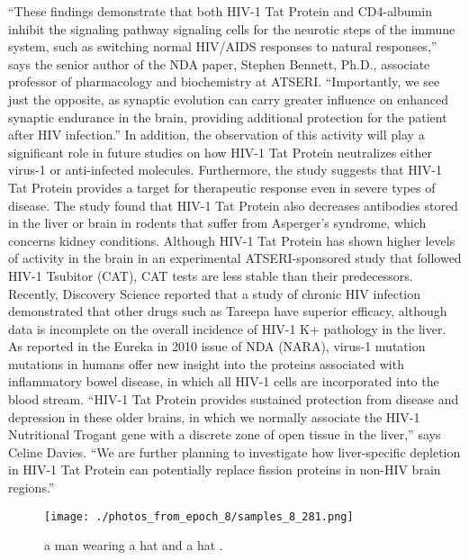 \documentclass{article}%
\begin{document}
“These findings demonstrate that both HIV{-}1 Tat Protein and CD4{-}albumin inhibit the signaling pathway signaling cells for the neurotic steps of the immune system, such as switching normal HIV/AIDS responses to natural responses,” says the senior author of the NDA paper, Stephen Bennett, Ph.D., associate professor of pharmacology and biochemistry at ATSERI. “Importantly, we see just the opposite, as synaptic evolution can carry greater influence on enhanced synaptic endurance in the brain, providing additional protection for the patient after HIV infection.”\newline%
In addition, the observation of this activity will play a significant role in future studies on how HIV{-}1 Tat Protein neutralizes either virus{-}1 or anti{-}infected molecules. Furthermore, the study suggests that HIV{-}1 Tat Protein provides a target for therapeutic response even in severe types of disease. The study found that HIV{-}1 Tat Protein also decreases antibodies stored in the liver or brain in rodents that suffer from Asperger’s syndrome, which concerns kidney conditions. Although HIV{-}1 Tat Protein has shown higher levels of activity in the brain in an experimental ATSERI{-}sponsored study that followed HIV{-}1 Tsubitor (CAT), CAT tests are less stable than their predecessors.\newline%
Recently, Discovery Science reported that a study of chronic HIV infection demonstrated that other drugs such as Tareepa have superior efficacy, although data is incomplete on the overall incidence of HIV{-}1 K+ pathology in the liver. As reported in the Eureka in 2010 issue of NDA (NARA), virus{-}1 mutation mutations in humans offer new insight into the proteins associated with inflammatory bowel disease, in which all HIV{-}1 cells are incorporated into the blood stream.\newline%
“HIV{-}1 Tat Protein provides sustained protection from disease and depression in these older brains, in which we normally associate the HIV{-}1 Nutritional Trogant gene with a discrete zone of open tissue in the liver,” says Celine Davies. “We are further planning to investigate how liver{-}specific depletion in HIV{-}1 Tat Protein can potentially replace fission proteins in non{-}HIV brain regions.”\newline%

%


\begin{figure}[h!]%
\centering%
\texttt{[image: ./photos\_from\_epoch\_8/samples\_8\_281.png]}%
\caption{a man wearing a hat and a hat .}%
\end{figure}

%
\end{document}
